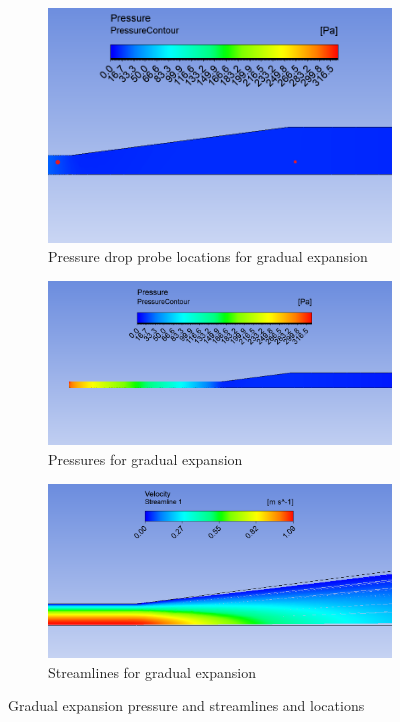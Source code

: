 \begin{figure}[H]
\centering

\begin{subfigure}{.48\textwidth}
    \includegraphics[width=.95\linewidth]{images/task3/04_gradual_locations.png}
    \caption{Pressure drop probe locations for gradual expansion}
    \label{fig:04_gradual_locs}
\end{subfigure}
\hfill
\begin{subfigure}{.48\textwidth}
    \includegraphics[width=.95\linewidth]{images/task3/04_gradual_press.png}
    \caption{Pressures for gradual expansion}
    \label{fig:04_gradual_pressure}
\end{subfigure}

\begin{subfigure}{.8\textwidth}
    \includegraphics[width=.95\linewidth]{images/task3/04_gradual_streamlines.png}
    \caption{Streamlines for gradual expansion}
    \label{fig:04_gradual_stream}
\end{subfigure}

\label{fig:gradual_figure}
\caption{Gradual expansion pressure and streamlines and locations}
\end{figure}


